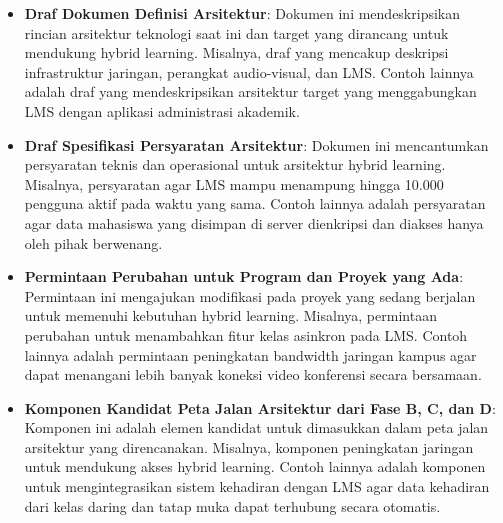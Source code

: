 \begin{itemize}
	\item \textbf{Draf Dokumen Definisi Arsitektur}: Dokumen ini mendeskripsikan rincian arsitektur teknologi saat ini dan target yang dirancang untuk mendukung hybrid learning. Misalnya, draf yang mencakup deskripsi infrastruktur jaringan, perangkat audio-visual, dan LMS. Contoh lainnya adalah draf yang mendeskripsikan arsitektur target yang menggabungkan LMS dengan aplikasi administrasi akademik.
	
	\item \textbf{Draf Spesifikasi Persyaratan Arsitektur}: Dokumen ini mencantumkan persyaratan teknis dan operasional untuk arsitektur hybrid learning. Misalnya, persyaratan agar LMS mampu menampung hingga 10.000 pengguna aktif pada waktu yang sama. Contoh lainnya adalah persyaratan agar data mahasiswa yang disimpan di server dienkripsi dan diakses hanya oleh pihak berwenang.
	
	\item \textbf{Permintaan Perubahan untuk Program dan Proyek yang Ada}: Permintaan ini mengajukan modifikasi pada proyek yang sedang berjalan untuk memenuhi kebutuhan hybrid learning. Misalnya, permintaan perubahan untuk menambahkan fitur kelas asinkron pada LMS. Contoh lainnya adalah permintaan peningkatan bandwidth jaringan kampus agar dapat menangani lebih banyak koneksi video konferensi secara bersamaan.
	
	\item \textbf{Komponen Kandidat Peta Jalan Arsitektur dari Fase B, C, dan D}: Komponen ini adalah elemen kandidat untuk dimasukkan dalam peta jalan arsitektur yang direncanakan. Misalnya, komponen peningkatan jaringan untuk mendukung akses hybrid learning. Contoh lainnya adalah komponen untuk mengintegrasikan sistem kehadiran dengan LMS agar data kehadiran dari kelas daring dan tatap muka dapat terhubung secara otomatis.
\end{itemize}


